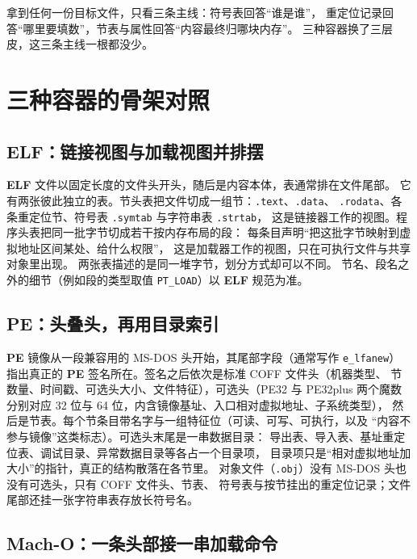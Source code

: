 \documentclass[12pt,a4paper,fontset=fandol]{ctexbook}
\newcommand{\Tp}[1]{\texttt{#1}}
\newcommand{\Sect}[1]{\texttt{.#1}}
\newcommand{\Mx}[1]{\textsf{#1}}
\newcommand{\Elf}{\textbf{\textsf{ELF}}}
\newcommand{\PeFmt}{\textbf{\textsf{PE}}}
\newcommand{\Macho}{\textbf{\textsf{Mach-O}}}
\begin{document}
\begin{guideline}[title={读目标文件的三条主线}]
拿到任何一份目标文件，只看三条主线：符号表回答“谁是谁”，
重定位记录回答“哪里要填数”，节表与属性回答“内容最终归哪块内存”。
三种容器换了三层皮，这三条主线一根都没少。
\end{guideline}

\section{三种容器的骨架对照}\label{sec:cl07-containers}

\subsection{\Elf：链接视图与加载视图并排摆}\label{sec:cl07-elf}

\Elf{} 文件以固定长度的文件头开头，随后是内容本体，表通常排在文件尾部。
它有两张彼此独立的表。节头表把文件切成一组节：\Sect{text}、\Sect{data}、
\Sect{rodata}、各条重定位节、符号表 \Sect{symtab} 与字符串表 \Sect{strtab}，
这是链接器工作的视图。程序头表把同一批字节切成若干按内存布局的段：
每条目声明“把这批字节映射到虚拟地址区间某处、给什么权限”，
这是加载器工作的视图，只在可执行文件与共享对象里出现。
两张表描述的是同一堆字节，划分方式却可以不同。
节名、段名之外的细节（例如段的类型取值 \Tp{PT\_LOAD}）以 \Elf{} 规范为准。

\subsection{\PeFmt：头叠头，再用目录索引}\label{sec:cl07-pe}

\PeFmt{} 镜像从一段兼容用的 MS-DOS 头开始，其尾部字段（通常写作 \Tp{e\_lfanew}）
指出真正的 \PeFmt{} 签名所在。签名之后依次是标准 COFF 文件头（机器类型、
节数量、时间戳、可选头大小、文件特征），可选头（\Mx{PE32} 与 \Mx{PE32plus}
两个魔数分别对应 32 位与 64 位，内含镜像基址、入口相对虚拟地址、子系统类型），
然后是节表。每个节条目带名字与一组特征位（可读、可写、可执行，以及
“内容不参与镜像”这类标志）。可选头末尾是一串数据目录：
导出表、导入表、基址重定位表、调试目录、异常数据目录等各占一个目录项，
目录项只是“相对虚拟地址加大小”的指针，真正的结构散落在各节里。
对象文件（\Tp{.obj}）没有 MS-DOS 头也没有可选头，只有 COFF 文件头、节表、
符号表与按节挂出的重定位记录；文件尾部还挂一张字符串表存放长符号名。

\subsection{\Macho：一条头部接一串加载命令}\label{sec:cl07-macho}
\end{document}
